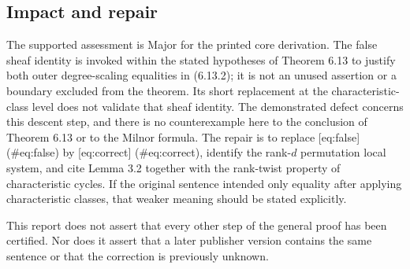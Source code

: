 \documentclass[10pt]{article}
\begin{document}
\subsection*{Impact and repair}
The supported assessment is Major for the printed core derivation. The false sheaf identity is invoked within the stated hypotheses of Theorem 6.13 to justify both outer degree-scaling equalities in (6.13.2); it is not an unused assertion or a boundary excluded from the theorem. Its short replacement at the characteristic-class level does not validate that sheaf identity. The demonstrated defect concerns this descent step, and there is no counterexample here to the conclusion of Theorem 6.13 or to the Milnor formula. The repair is to replace [eq:false] (\#eq:false) by [eq:correct] (\#eq:correct), identify the rank-\(d\) permutation local system, and cite Lemma 3.2 together with the rank-twist property of characteristic cycles. If the original sentence intended only equality after applying characteristic classes, that weaker meaning should be stated explicitly.\par
This report does not assert that every other step of the general proof has been certified. Nor does it assert that a later publisher version contains the same sentence or that the correction is previously unknown.\par
\end{document}
